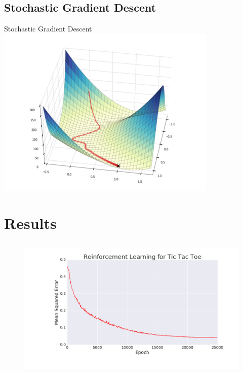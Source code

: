 \subsection{Stochastic Gradient Descent}

\begin{frame}{Stochastic Gradient Descent}
\includegraphics[width = 0.8 \textwidth]{sgd}\centering
\end{frame}

\section{Results}
\subsection{}

\begin{frame}
\begin{figure}
\includegraphics[width=1 \textwidth]{reinforcement_ttt}
\end{figure}
\end{frame}

